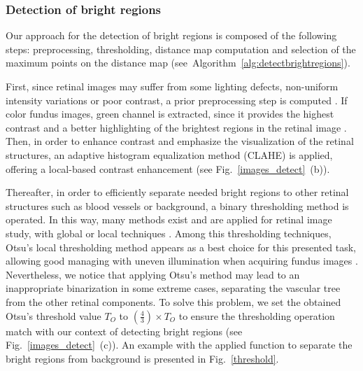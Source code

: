 \subsubsection{\label{detect_bright}Detection of bright regions}

Our approach for the detection of bright regions is composed of the following steps: preprocessing, thresholding, distance map computation and selection of the maximum points on the distance map \mbox{(see Algorithm~\ref{alg:detectbrightregions})}.



First, since retinal images may suffer from some lighting defects, non-uniform intensity variations or poor contrast, a prior preprocessing step is computed \citep{hashim,youssif}. If color fundus images, green channel is extracted, since it provides the highest contrast and a better highlighting of the brightest regions in the retinal image \citep{inoue}.
Then, in order to enhance contrast and emphasize the visualization of the retinal structures, an adaptive histogram equalization method (CLAHE) \citep{pizer} is applied, offering a local-based contrast enhancement (see \mbox{Fig. \ref{images_detect} (b)}).

Thereafter, in order to efficiently separate needed bright regions to other retinal structures such as blood vessels or background, a binary thresholding method is operated. In this way, many methods exist and are applied for retinal image study, with global or local techniques \citep{soares}. Among this thresholding techniques, Otsu's local thresholding method appears as a best choice for this presented task, allowing good managing with uneven illumination when acquiring fundus images \citep{abramoff}.
Nevertheless, we notice that applying Otsu's method may lead to an inappropriate binarization in some extreme cases, separating the vascular tree from the other retinal components. To solve this problem, we set the obtained Otsu's threshold value $T_O$ to $(\frac{4}{3}) \times T_O$ to ensure the thresholding operation match with our context of detecting bright regions (see \mbox{Fig. \ref{images_detect} (c)}). An example with the applied function to separate the bright regions from background is presented in \mbox{Fig. \ref{threshold}}.


